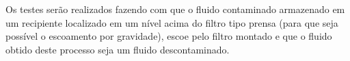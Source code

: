 Os testes serão realizados fazendo com que o fluido contaminado armazenado em um
recipiente localizado em um nível acima do filtro tipo prensa (para que seja
possível o escoamento por gravidade), escoe pelo filtro montado e que o fluido
obtido deste processo seja um fluido descontaminado.

